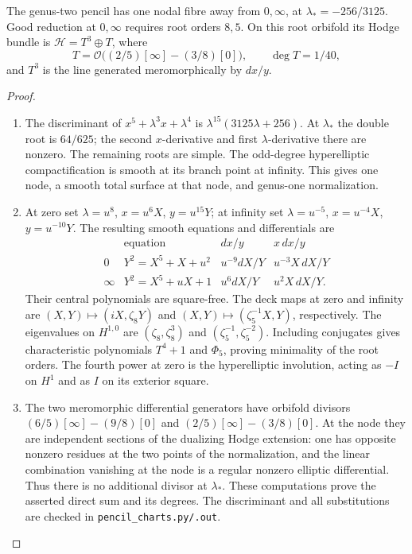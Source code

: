 \begin{theorem}\label{night:P1.4}
The genus-two pencil has one nodal fibre away from $0,\infty$, at
$\lambda_*=-256/3125$.  Good reduction at $0,\infty$ requires root
orders $8,5$.  On this root orbifold its Hodge bundle is
$\mathcal H=T^3\oplus T$, where
\[
T=\mathcal O\bigl((2/5)[\infty]-(3/8)[0]\bigr),\qquad
\deg T=1/40,
\]
and $T^3$ is the line generated meromorphically by $dx/y$.
\end{theorem}
\begin{proof}
\begin{enumerate}[label=\arabic*.]
\item The discriminant of $x^5+\lambda^3x+\lambda^4$ is
$\lambda^{15}(3125\lambda+256)$.
At $\lambda_*$ the double root is $64/625$;
the second $x$-derivative and first $\lambda$-derivative there are
nonzero.  The remaining roots are simple.  The odd-degree
hyperelliptic compactification is smooth at its branch point at
infinity.  This gives one node, a smooth total surface at that node,
and genus-one normalization.

\item At zero set $\lambda=u^8$, $x=u^6X$, $y=u^{15}Y$; at infinity set
$\lambda=u^{-5}$, $x=u^{-4}X$, $y=u^{-10}Y$.
The resulting smooth equations and differentials are
\[
\begin{array}{c|c|c|c}
 &\text{equation}&dx/y&x\,dx/y\\\hline
0&Y^2=X^5+X+u^2&u^{-9}dX/Y&u^{-3}X\,dX/Y\\
\infty&Y^2=X^5+uX+1&u^6dX/Y&u^2X\,dX/Y.
\end{array}
\]
Their central polynomials are square-free.  The deck maps at zero and
infinity are $(X,Y)\mapsto(iX,\zeta_8Y)$ and
$(X,Y)\mapsto(\zeta_5^{-1}X,Y)$, respectively.
The eigenvalues on $H^{1,0}$ are $(\zeta_8,\zeta_8^3)$ and
$(\zeta_5^{-1},\zeta_5^{-2})$.  Including conjugates gives characteristic
polynomials $T^4+1$ and $\Phi_5$, proving minimality of the root orders.
The fourth power at zero is the hyperelliptic involution, acting as
$-I$ on $H^1$ and as $I$ on its exterior square.

\item The two meromorphic differential generators have orbifold divisors
$(6/5)[\infty]-(9/8)[0]$ and
$(2/5)[\infty]-(3/8)[0]$.
At the node they are independent sections of the dualizing Hodge
extension: one has opposite nonzero residues at the two points of the
normalization, and the linear combination vanishing at the node is a
regular nonzero elliptic differential.  Thus there is no additional
divisor at $\lambda_*$.  These computations prove the asserted direct
sum and its degrees.  The discriminant and all substitutions are
checked in \texttt{pencil\_charts.py/.out}.

\end{enumerate}
\end{proof}




